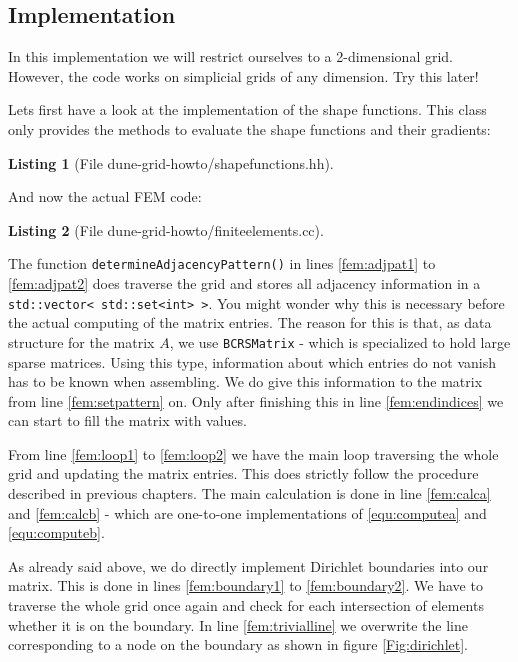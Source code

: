\documentclass[11pt,a4paper,headinclude,footinclude,DIV16,normalheadings]{scrreprt}
\newtheorem{lst}{Listing}
\begin{document}
\subsection{Implementation}

In this implementation we will restrict ourselves to a 2-dimensional grid. However, the code works on simplicial grids of any dimension. Try this later!

Lets first have a look at the implementation of the shape functions. This class only provides the methods to evaluate the shape functions and their gradients:

\begin{lst}[File dune-grid-howto/shapefunctions.hh] \mbox{}
\nopagebreak

\end{lst}

And now the actual FEM code:

\begin{lst}[File dune-grid-howto/finiteelements.cc] \mbox{}
\nopagebreak

\end{lst}

The function \lstinline!determineAdjacencyPattern()! in lines \ref{fem:adjpat1} to \ref{fem:adjpat2} does traverse the grid and stores all adjacency information in a \lstinline!std::vector< std::set<int> >!. You might wonder why this is necessary before the actual computing of the matrix entries. The reason for this is that, as data structure for the matrix $A$, we use \lstinline!BCRSMatrix! - which is specialized to hold large sparse matrices. Using this type, information about which entries do not vanish has to be known when assembling. We do give this information to the matrix from line \ref{fem:setpattern} on. Only after finishing this in line \ref{fem:endindices} we can start to fill the matrix with values.

From line \ref{fem:loop1} to \ref{fem:loop2} we have the main loop traversing the whole grid and updating the matrix entries. This does strictly follow the procedure described in previous chapters. The main calculation is done in line \ref{fem:calca} and \ref{fem:calcb} - which are one-to-one implementations of \ref{equ:computea} and \ref{equ:computeb}.

As already said above, we do directly implement Dirichlet boundaries into our matrix. This is done in lines \ref{fem:boundary1} to \ref{fem:boundary2}. We have to traverse the whole grid once again and check for each intersection of elements whether it is on the boundary. In line \ref{fem:trivialline} we overwrite the line corresponding to a node on the boundary as shown in figure \ref{Fig:dirichlet}.
\end{document}
